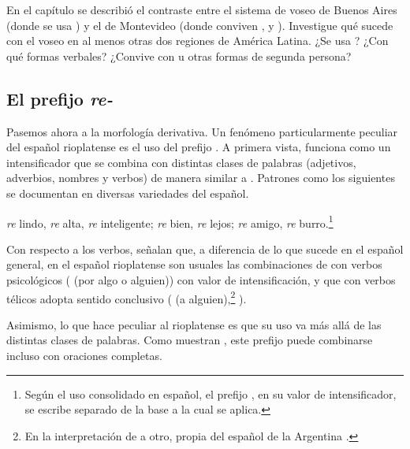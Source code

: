 \begin{ejercicio}\label{ej:15-voseo}
En el capítulo se describió el contraste entre el sistema de voseo de Buenos
Aires (donde se usa ) y el de Montevideo (donde conviven
,  y ). Investigue qué sucede
con el voseo en al menos otras dos regiones de América Latina. ¿Se usa
? ¿Con qué formas verbales? ¿Convive con  u otras formas de
segunda persona?
\end{ejercicio}

\subsection{El prefijo \textit{re-}}\label{sec:15-re}

Pasemos ahora a la morfología derivativa. Un fenómeno particularmente peculiar
del español rioplatense es el uso del prefijo 
\parencite{giammatteo2012albano,kornfeld2013}. A primera vista, 
funciona como un intensificador que se combina con distintas clases de palabras
(adjetivos, adverbios, nombres y verbos) de manera similar a . Patrones
como los siguientes se documentan en diversas variedades del español.

\begin{exe}
  \ex\label{ex:15-re} \textit{re} lindo, \textit{re} alta, \textit{re}
      inteligente; \textit{re} bien, \textit{re} lejos; \textit{re} amigo,
      \textit{re} burro.\footnote{Según el uso consolidado en español, el prefijo
      , en su valor de intensificador, se escribe separado de la base
      a la cual se aplica.}
\end{exe}

Con respecto a los verbos, \textcite{giammatteo2012albano} señalan que, a
diferencia de lo que sucede en el español general, en el español rioplatense son
usuales las combinaciones de  con verbos psicológicos ( (por algo o alguien)) con valor de
intensificación, y que con verbos télicos adopta sentido conclusivo
( (a alguien),\footnote{En la interpretación de  a otro, propia del español de la Argentina
\parencite[80]{conde2004}.} ).

Asimismo, lo que hace peculiar al  rioplatense es que su uso va más
allá de las distintas clases de palabras. Como muestran
\textcite{kornfeld2013}, este prefijo puede combinarse incluso con oraciones
completas.

